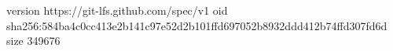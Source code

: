 version https://git-lfs.github.com/spec/v1
oid sha256:584ba4c0cc413e2b141c97e52d2b101ffd697052b8932ddd412b74ffd307fd6d
size 349676
